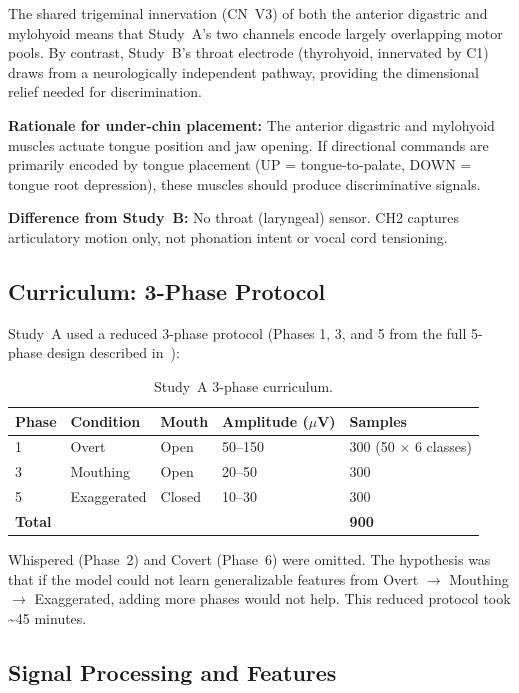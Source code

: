 \documentclass[11pt, a4paper]{article}
\begin{document}
The shared trigeminal innervation (CN~V3) of both the anterior digastric and mylohyoid means that Study~A's two channels encode largely overlapping motor pools. By contrast, Study~B's throat electrode (thyrohyoid, innervated by C1) draws from a neurologically independent pathway, providing the dimensional relief needed for discrimination.

\textbf{Rationale for under-chin placement:} The anterior digastric and mylohyoid muscles actuate tongue position and jaw opening. If directional commands are primarily encoded by tongue placement (UP = tongue-to-palate, DOWN = tongue root depression), these muscles should produce discriminative signals.

\textbf{Difference from Study~B:} No throat (laryngeal) sensor. CH2 captures articulatory motion only, not phonation intent or vocal cord tensioning.

\subsection{Curriculum: 3-Phase Protocol}

Study~A used a reduced 3-phase protocol (Phases 1, 3, and 5 from the full 5-phase design described in~\cite[{\S}4.2]{kho2026companion}):

\begin{table}[ht]
\centering
\caption{Study~A 3-phase curriculum.}
\label{tab:curriculum}
\begin{tabular}{@{}lllll@{}}
\toprule
Phase & Condition & Mouth & Amplitude ($\mu$V) & Samples \\
\midrule
1 & Overt & Open & 50--150 & 300 (50 $\times$ 6 classes) \\
3 & Mouthing & Open & 20--50 & 300 \\
5 & Exaggerated & Closed & 10--30 & 300 \\
\midrule
\textbf{Total} & & & & \textbf{900} \\
\bottomrule
\end{tabular}
\end{table}

Whispered (Phase~2) and Covert (Phase~6) were omitted. The hypothesis was that if the model could not learn generalizable features from Overt $\to$ Mouthing $\to$ Exaggerated, adding more phases would not help. This reduced protocol took \textasciitilde45 minutes.

\subsection{Signal Processing and Features}
\end{document}
